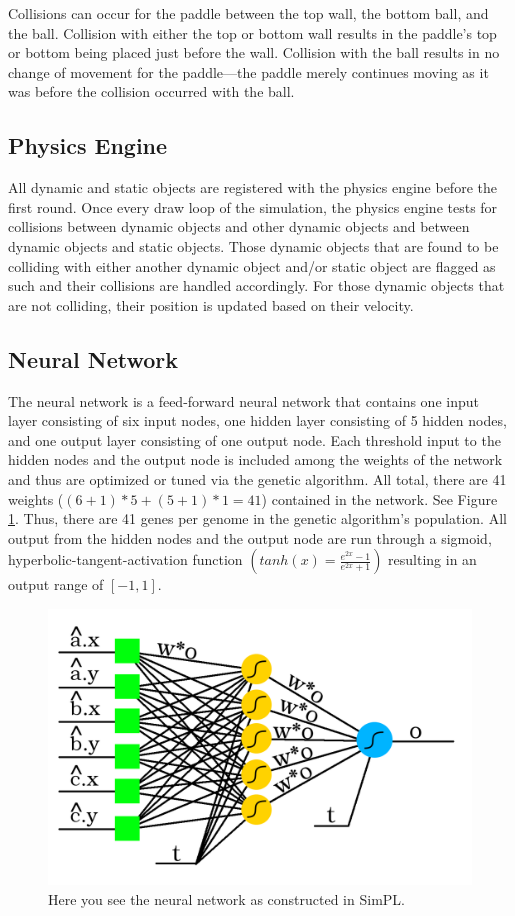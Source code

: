 \documentclass[a4paper,10pt]{article}
\begin{document}
Collisions can occur for the paddle between the top wall, the bottom ball, and the ball. Collision with either the top or bottom wall results in the paddle's top or bottom being placed just before the wall. Collision with the ball results in no change of movement for the paddle---the paddle merely continues moving as it was before the collision occurred with the ball.

\subsection{Physics Engine}

All dynamic and static objects are registered with the physics engine before the first round. Once every draw loop of the simulation, the physics engine tests for collisions between dynamic objects and other dynamic objects and between dynamic objects and static objects. Those dynamic objects that are found to be colliding with either another dynamic object and/or static object are flagged as such and their collisions are handled accordingly. For those dynamic objects that are not colliding, their position is updated based on their velocity.

\subsection{Neural Network}

The neural network is a feed-forward neural network that contains one input layer consisting of six input nodes, one hidden layer consisting of 5 hidden nodes, and one output layer consisting of one output node. Each threshold input to the hidden nodes and the output node is included among the weights of the network and thus are optimized or tuned via the genetic algorithm. All total, there are 41 weights ($(6+1)*5+(5+1)*1=41$) contained in the network. See Figure \ref{fig:nn}. Thus, there are 41 genes per genome in the genetic algorithm's population. All output from the hidden nodes and the output node are run through a sigmoid, hyperbolic-tangent-activation function $\left ( tanh(x)=\frac{e^{2x}-1}{e^{2x}+1} \right )$ resulting in an output range of $[-1,1]$.

\begin{figure}[H]  
  \centering
  \includegraphics[width=1\textwidth]{figures/nn.png}
  \caption{Here you see the neural network as constructed in SimPL.}
  \label{fig:nn}
\end{figure}
\end{document}
